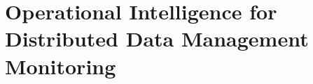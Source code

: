 \part{Operational Intelligence for Distributed Data Management Monitoring}
\label{partII}



% 


% 


    
    

    
    
    
    
    








